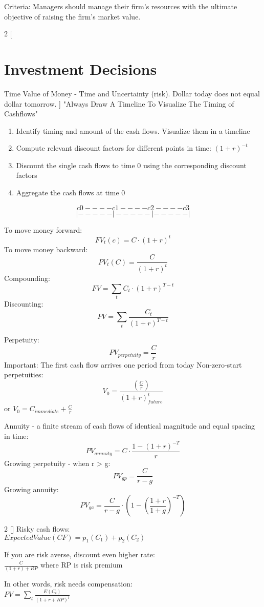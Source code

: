 \documentclass[9pt]{article}
\begin{document}
Criteria: Managers should manage their firm’s resources with the
ultimate objective of raising the firm’s market value.

\begin{multicols}{2}
[
\section{Investment Decisions}
Time Value of Money - Time and Uncertainty (risk). Dollar today does not equal dollar tomorrow.
]
"Always Draw A Timeline To Visualize The Timing of Cashflows"
\begin{enumerate}
\item Identify timing and amount of the cash flows. Visualize them in a
timeline
\item Compute relevant discount factors for different points in time: $(1 + r)^{-t}$
\item Discount the single cash flows to time 0 using the corresponding
discount factors
\item Aggregate the cash flows at time 0
\end{enumerate}

$$c0----c1----c2----c3$$
$$|-----|-----|-----|$$


To move money forward: $$FV_t(c) = C \cdot (1+r)^t$$ 
To move money backward: $$PV_t(C) = \frac{C}{(1+r)^t}$$
Compounding: $$FV = \sum_t C_t \cdot (1+r)^{T-t}$$
Discounting: $$PV = \sum_t \frac{C_t}{(1+r)^{T-t}}$$

Perpetuity: $$PV_{perpetuity} = \frac{C}{r}$$
Important: The first cash flow arrives one period from today
Non-zero-start perpetuities: $$V_0 = \frac{(\frac{C}{r})}{(1+r)^t_{future}}$$ or $V_0 = C_{immediate} + \frac{C}{r}$

Annuity - a finite stream of cash flows of identical
magnitude and equal spacing in time: $$ PV_{annuity} = C \cdot \frac{1-(1+r)^{-T}}{r} $$
Growing perpetuity - when r > g: $$ PV_{gp} = \frac{C}{r-g} $$
Growing annuity: $$ PV_{ga} = \frac{C}{r-g} \cdot (1 - (\frac{1+r}{1+g})^{-T}) $$
\end{multicols}

\begin{multicols}{2}
[]
Risky cash flows: \\
$ExpectedValue(CF) = p_1(C_1) + p_2(C_2)$

If you are risk averse, discount even higher rate: \\
$\frac{C}{(1+r)+RP}$ where RP is risk premium

In other words, risk needs compensation: \\
$PV = \sum_t \frac{E(C_t)}{(1+r+RP)^t}$

\end{multicols}
\end{document}
